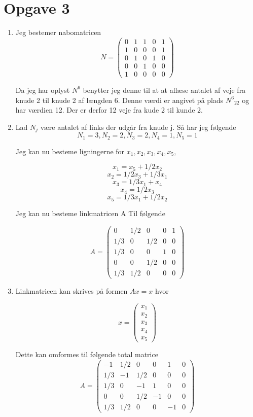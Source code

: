 \documentclass[12pt]{article}
\begin{document}
\section{Opgave 3}
\begin{enumerate}[{a}]
\item
Jeg bestemer nabomatricen
$$N = \left(\begin{array}{ccccc}
0&1&1&0&1
\\
1&0&0&0&1
\\
0&1&0&1&0
\\
0&0&1&0&0
\\
1&0&0&0&0
\end{array}\right)$$

Da jeg har oplyst $N^{6}$ benytter jeg denne til at at aflæse antalet af veje
fra knude 2 til knude 2 af længden 6. Denne værdi er angivet på plads
${N^{6}}_{22}$ og har værdien 12. Der er derfor 12 veje fra kude 2 til kunde 2.

\item
Lad $N_{j}$ være antalet af links der udgår fra knude j. Så har jeg følgende
$$N_{1} = 3, N_{2} = 2, N_{3} = 2, N_{4} = 1, N_{5} = 1$$

Jeg kan nu besteme ligningerne for $x_1, x_2, x_3, x_4, x_5, $

$$ x_1 = x_5 + 1/2 x_2$$
$$ x_2 = 1/2x_3 + 1/3x_1$$
$$ x_3 = 1/3x_1 + x_4$$ 
$$ x_4 = 1/2x_3$$
$$ x_5 = 1/3x_1 + 1/2x_2$$

Jeg kan nu besteme linkmatricen A Til følgende

$$A = \left(\begin{array}{ccccc}
0&1/2&0&0&1
\\
1/3&0&1/2&0&0
\\
1/3&0&0&1&0
\\
0&0&1/2&0&0
\\
1/3&1/2&0&0&0
\end{array}\right)$$

\item
Linkmatricen kan skrives på formen $Ax=x$ hvor

$$x = \left(\begin{array}{c}
x_1\\x_2\\x_3\\x_4\\x_5
\end{array}\right)$$

Dette kan omformes til følgende total matrice
$$A = \left(\begin{array}{ccccc|c}
-1&1/2&0&0&1
&0\\
1/3&-1&1/2&0&0
&0\\
1/3&0&-1&1&0
&0\\
0&0&1/2&-1&0
&0\\
1/3&1/2&0&0&-1&0
\end{array}\right)$$


\end{enumerate}
\end{document}
